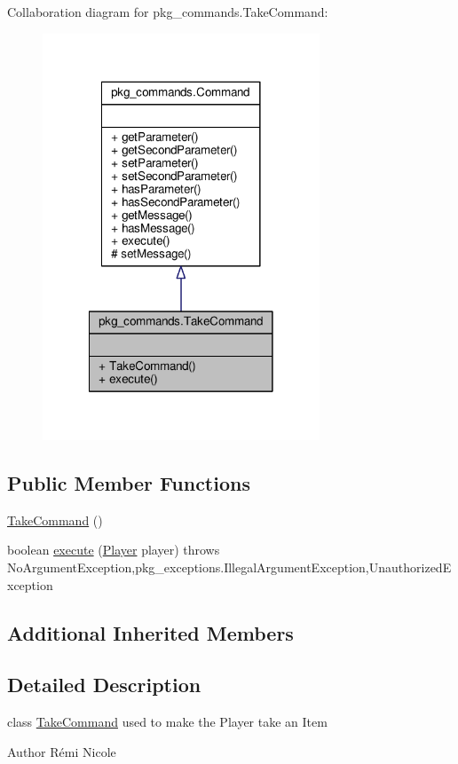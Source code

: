 Collaboration diagram for pkg\-\_\-commands.\-Take\-Command\-:
\nopagebreak
\begin{figure}[H]
\begin{center}
\leavevmode
\includegraphics[width=234pt]{classpkg__commands_1_1TakeCommand__coll__graph}
\end{center}
\end{figure}
\subsection*{Public Member Functions}
\begin{DoxyCompactItemize}
\item 
\hyperlink{classpkg__commands_1_1TakeCommand_a1f6989e8d9dce087d5f70cf748c53119}{Take\-Command} ()
\item 
boolean \hyperlink{classpkg__commands_1_1TakeCommand_a17789062aaf2ab5747c7eeac118875cd}{execute} (\hyperlink{classpkg__world_1_1Player}{Player} player)  throws No\-Argument\-Exception,pkg\-\_\-exceptions.\-Illegal\-Argument\-Exception,\-Unauthorized\-Exception 
\end{DoxyCompactItemize}
\subsection*{Additional Inherited Members}


\subsection{Detailed Description}
class \hyperlink{classpkg__commands_1_1TakeCommand}{Take\-Command} used to make the Player take an Item \begin{DoxyAuthor}{Author}
Rémi Nicole 
\end{DoxyAuthor}


